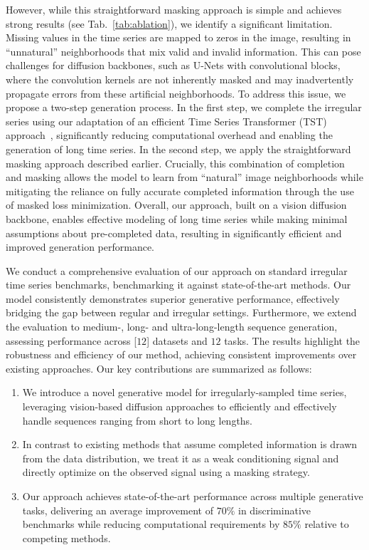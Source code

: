 \documentclass{article}
\theoremstyle{plain}
\theoremstyle{definition}
\theoremstyle{remark}
\newcommand {\idan}[1]{{\color{red}[#1]}}
\begin{document}
However, while this straightforward masking approach is simple and achieves strong results (see Tab.~\ref{tab:ablation}), we identify a significant limitation. Missing values in the time series are mapped to zeros in the image, resulting in ``unnatural'' neighborhoods that mix valid and invalid information. This can pose challenges for diffusion backbones, such as U-Nets with convolutional blocks, where the convolution kernels are not inherently masked and may inadvertently propagate errors from these artificial neighborhoods. To address this issue, we propose a two-step generation process. In the first step, we complete the irregular series using our adaptation of an efficient Time Series Transformer (TST) approach~\cite{zerveas2021transformer}, significantly reducing computational overhead and enabling the generation of long time series. In the second step, we apply the straightforward masking approach described earlier. Crucially, this combination of completion and masking allows the model to learn from ``natural'' image neighborhoods while mitigating the reliance on fully accurate completed information through the use of masked loss minimization. Overall, our approach, built on a vision diffusion backbone, enables effective modeling of long time series while making minimal assumptions about pre-completed data, resulting in significantly efficient and improved generation performance. 


We conduct a comprehensive evaluation of our approach on standard irregular time series benchmarks, benchmarking it against state-of-the-art methods. Our model consistently demonstrates superior generative performance, effectively bridging the gap between regular and irregular settings. Furthermore, we extend the evaluation to medium-, long- and ultra-long-length sequence generation, assessing performance across \idan{$12$} datasets and $12$ tasks. The results highlight the robustness and efficiency of our method, achieving consistent improvements over existing approaches. Our key contributions are summarized as follows:
\vspace{-1mm}
\begin{enumerate}
    \item We introduce a novel generative model for irregularly-sampled time series, leveraging vision-based diffusion approaches to efficiently and effectively handle sequences ranging from short to long lengths.
    \item In contrast to existing methods that assume completed information is drawn from the data distribution, we treat it as a weak conditioning signal and directly optimize on the observed signal using a masking strategy.
    \item Our approach achieves state-of-the-art performance across multiple generative tasks, delivering an average improvement of $70\%$ in discriminative benchmarks while reducing computational requirements by $85\%$ relative to competing methods.
\end{enumerate}
	
\end{document}
